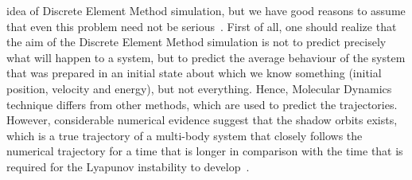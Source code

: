 idea of Discrete Element Method simulation, but we have good reasons to assume 
that even this 
problem 
need not be serious~\citep{Daan1996}. First of all, one should realize that 
the aim of the 
Discrete Element Method simulation is not to predict precisely what will 
happen to a system, but 
to 
predict the average behaviour of the system that was prepared in an initial 
state about which we 
know something (initial position, velocity and energy), but not everything. 
Hence, Molecular 
Dynamics technique differs from other methods, which are used to predict the 
trajectories. 
However, 
considerable numerical evidence suggest that the shadow orbits exists, which 
is a true trajectory 
of a multi-body system that closely follows the numerical trajectory for a 
time that is longer in 
comparison with the time that is required for the Lyapunov instability to 
develop~\citep{Daan1996}.

